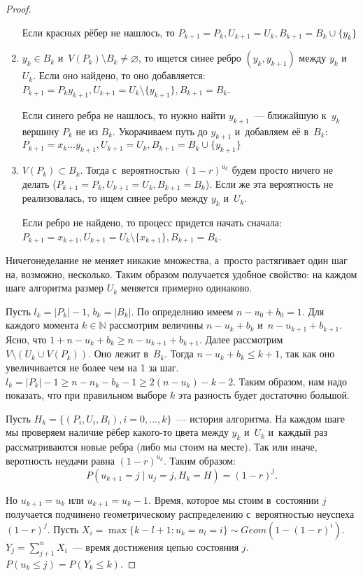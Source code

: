 \documentclass{article}
\begin{document}
\begin{proof}
\begin{enumerate}
			Если красных рёбер не нашлось, то $P_{k+1} = P_k, U_{k+1} = U_k, B_{k+1} = B_k \cup \{y_k\}$
		\item $y_k \in B_k$ и~$V(P_k) \setminus B_k \ne \varnothing$, то ищется синее ребро $(y_k,
			y_{k+1})$ между $y_k$ и~$U_k$. Если оно найдено, то оно добавляется: $P_{k+1} = P_k y_{k+1},
			U_{k+1} = U_k \setminus \{y_{k+1}\}, B_{k+1} = B_k$.

			Если синего ребра не нашлось, то нужно найти $y_{k+1}$~--- ближайшую к~$y_k$ вершину $P_k$ не
			из $B_k$. Укорачиваем путь до $y_{k+1}$ и~добавляем её в~$B_k$: $P_{k+1} = x_k \ldots y_{k+1},
			U_{k+1} = U_k, B_{k+1} = B_k \cup \{y_{k+1}\}$
		\item $V(P_k) \subset B_k$. Тогда с~вероятностью $(1-r)^{u_k}$ будем просто ничего не делать
			($P_{k+1} = P_k, U_{k+1} = U_k, B_{k+1} = B_k$). Если же эта вероятность не реализовалась, то
			ищем синее ребро между $y_k$ и~$U_k$.

			Если ребро не найдено, то процесс придется начать сначала: $P_{k+1} = x_{k+1}, U_{k+1} = U_k
			\setminus \{x_{k+1}\}, B_{k+1} = B_k$.
	\end{enumerate}

	\begin{remark}
		Ничегонеделание не меняет никакие множества, а~просто растягивает один шаг на, возможно,
		несколько. Таким образом получается удобное свойство: на каждом шаге алгоритма размер $U_k$
		меняется примерно одинаково.
	\end{remark}

	Пусть $l_k = |P_k| - 1$, $b_k = |B_k|$. По определнию имеем $n - u_0 + b_0 = 1$. Для каждого
	момента $k \in \mathbb{N}$ рассмотрим величины $n - u_k + b_k$ и~$n - u_{k+1} + b_{k+1}$. Ясно,
	что $1 + n - u_k + b_k \ge n - u_{k+1} + b_{k+1}$. Далее рассмотрим
	$V \setminus (U_k \cup V(P_k))$. Оно лежит в~$B_k$. Тогда $n - u_k + b_k \le k + 1$, так как оно
	увеличивается не более чем на 1 за шаг. $l_k = |P_k| - 1 \ge n - n_k - b_k - 1 \ge 2(n - u_k) - k
	- 2$. Таким образом, нам надо показать, что при правильном выборе $k$ эта разность будет
	достаточно большой.

	Пусть $H_k = \{ (P_i, U_i, B_i), i = 0, \ldots, k\}$~--- история алгоритма. На каждом шаге мы
	проверяем наличие рёбер какого-то цвета между $y_k$ и~$U_k$ и~каждый раз рассматриваются новые
	ребра (либо мы стоим на месте). Так или иначе, веротность неудачи равна $(1 - r)^{u_k}$. Таким
	образом:
	$$P(u_{k+1} = j \mid u_j = j, H_k = H) = (1 - r)^{j}.$$

	Но $u_{k+1} = u_k$ или $u_{k+1} = u_k - 1$. Время, которое мы стоим в~состоянии $j$ получается
	подчинено геометрическому распределению с~вероятностью неуспеха $(1 - r)^j$. Пусть $X_i =
	\max\{k-l+1: u_k = u_l = i\} \sim Geom(1 - (1-r)^i)$. $Y_j = \sum\limits_{j+1}^n X_i$~--- время
	достижения цепью состояния $j$. $P(u_k \le j) = P(Y_k \le k)$.


\end{proof}
\end{document}

